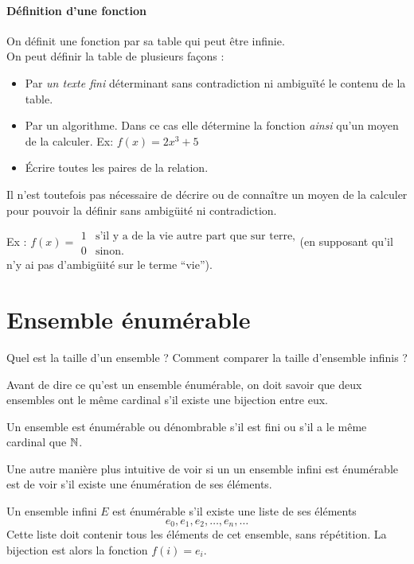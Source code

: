 \paragraph{Définition d'une fonction}
\label{par:d_finition_d_une_fonciton}
On définit une fonction par sa table qui peut être infinie.\\
On peut définir la table de plusieurs façons :
\begin{itemize}
	\item Par \emph{un texte fini} déterminant sans contradiction ni ambiguïté le contenu 
		de la table.
	\item Par un algorithme. Dans ce cas elle détermine la fonction \textit{ainsi} qu'un moyen de la calculer.
		\subitem Ex: $f(x) = 2x^3+5$
	\item Écrire toutes les paires de la relation.
\end{itemize}
Il n'est toutefois pas nécessaire de décrire ou de connaître un moyen de la calculer
pour pouvoir la définir sans ambigüité ni contradiction. 

Ex : $f(x) = \begin{array}{ll} 1 & \text{s'il y a de la vie autre part que sur terre,} \\ 0 & \text{sinon.}\end{array}$(en supposant qu'il n'y ai pas d'ambigüité sur le terme ``vie'').\\

\section{Ensemble énumérable}
\label{sec:ensemble_num_rables}
Quel est la taille d'un ensemble ?  Comment comparer la taille d'ensemble infinis ?

Avant de dire ce qu'est un ensemble énumérable, on doit savoir que deux ensembles
ont le même cardinal s'il existe une bijection entre eux.

\begin{mydef}
	Un ensemble est énumérable ou dénombrable s'il est fini ou s'il a le même cardinal que $\mathbb{N}$.
\end{mydef}
Une autre manière plus intuitive de voir si un un ensemble infini est  énumérable est de voir s'il existe une énumération de ses éléments.

\begin{myprop} 
Un ensemble infini $E$ est énumérable s'il existe une liste de ses éléments  
\[
e_0, e_1, e_2, \ldots , e_n, \ldots
\]
Cette liste doit contenir tous les éléments de cet ensemble, sans répétition.  La bijection est alors la fonction $f(i) = e_i$.  
\end{myprop}

